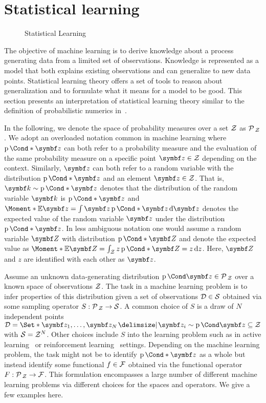 \section{Statistical learning}
\label{toc:bayesian_ml:statistical_learning}
\begin{figure}[t]
    \centering
    \caption{
        Statistical Learning
        \label{fig:bayesian_ml:statistical_learning}
    }
\end{figure}
The objective of machine learning is to derive knowledge about a process generating data from a limited set of observations.
Knowledge is represented as a model that both explains existing observations and can generalize to new data points.
Statistical learning theory offers a set of tools to reason about generalization and to formulate what it means for a model to be good.
This section presents an interpretation of statistical learning theory similar to the definition of probabilistic numerics in~\parencite{oates_modern_2019,cockayne_bayesian_2019}.

In the following, we denote the space of probability measures over a set $\mathcal{Z}$ as $\operatorname{\mathcal{P}\mkern2mu}_{\mathcal{Z}}$.
We adopt an overloaded notation common in machine learning where $\Prob*{\mat{z}}$ can both refer to a probability measure and the evaluation of the same probability measure on a specific point $\mat{z} \in \Zc$ depending on the context.
Similarly, $\mat{z}$ can both refer to a random variable with the distribution $\Prob*{\mat{z}}$ and an element $\mat{z} \in \Zc$.
That is, $\mat{k} \sim \Prob*{\mat{z}}$ denotes that the distribution of the random variable $\mat{k}$ is $\Prob*{\mat{z}}$ and $\Moment*{\E}{\mat{z}} = \int \mat{z} \Prob*{\mat{z}} \diff \mat{z}$ denotes the expected value of the random variable $\mat{z}$ under the distribution $\Prob*{\mat{z}}$.
In less ambiguous notation one would assume a random variable $\mat{Z}$ with distribution $\Prob*{\mat{Z}}$ and denote the expected value as $\Moment*{\E}{\mat{Z}} = \int_{\Zc} z \Prob*{\mat{Z} = z} \diff z$.
Here, $\mat{Z}$ and $z$ are identified with each other as $\mat{z}$.

Assume an unknown data-generating distribution $\Prob{\mat{z}} \in \Probs{\Zc}$ over a known space of observations $\mathcal{Z}$.
The task in a machine learning problem is to infer properties of this distribution given a set of observations $\mathcal{D} \in \mathcal{S}$ obtained via some sampling operator $S : \operatorname{\mathcal{P}\mkern2mu}_{\mathcal{Z}} \to \mathcal{S}$.
A common choice of $S$ is a draw of $N$ independent points $\Dc = \Set*{\mat{z}_1, \dots, \mat{z}_N \with \mat{z}_i \sim \Prob{\mat{z}}} \subseteq \Zc$ with $\mathcal{S} = \mathcal{Z}^N$.
Other choices include $S$ into the learning problem such as in active learning~\parencite{murphy_machine_2012} or reinforcement learning~\parencite{sutton_reinforcement_2018} settings.
Depending on the machine learning problem, the task might not be to identify $\Prob*{\mat{z}}$ as a whole but instead identify some functional $f \in \mathcal{F}$ obtained via the functional operator $F : \operatorname{\mathcal{P}\mkern2mu}_{\mathcal{Z}} \to \mathcal{F}$.
This formulation encompasses a large number of different machine learning problems via different choices for the spaces and operators.
We give a few examples here.

